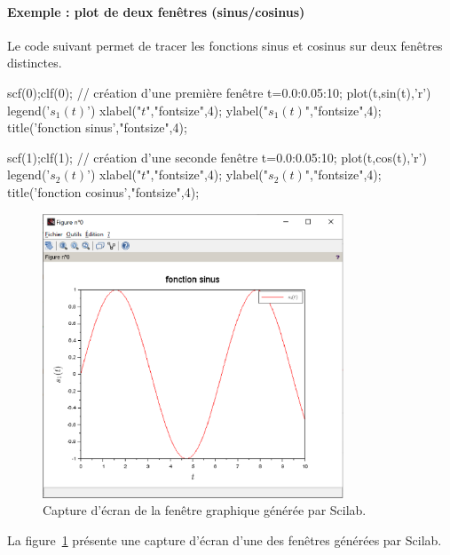 \paragraph{Exemple : plot de deux fenêtres (sinus/cosinus)}
Le code suivant permet de tracer les fonctions sinus et cosinus sur deux 
fenêtres distinctes. 
\begin{Scilabcode}
scf(0);clf(0); // création d'une première fenêtre
t=0.0:0.05:10; 
plot(t,sin(t),'r')
legend('$s_1(t)$')
xlabel("$t$","fontsize",4);
ylabel("$s_1(t)$","fontsize",4);
title('fonction sinus',"fontsize",4);

scf(1);clf(1); // création d'une seconde fenêtre    
t=0.0:0.05:10;
plot(t,cos(t),'r')
legend('$s_2(t)$')
xlabel("$t$","fontsize",4);
ylabel("$s_2(t)$","fontsize",4);
title('fonction cosinus',"fontsize",4);  
\end{Scilabcode}
\begin{figure}[!ht]
    \centering
    \includegraphics[width=0.8\textwidth]{fig/capture_SCILAB.eps}
    \caption{Capture d'écran de la fenêtre graphique générée 
             par Scilab.\label{fig-capture-SCILAB}}
\end{figure}
La figure~\cref{fig-capture-SCILAB} présente une capture d'écran 
d'une des fenêtres générées par Scilab.
          
